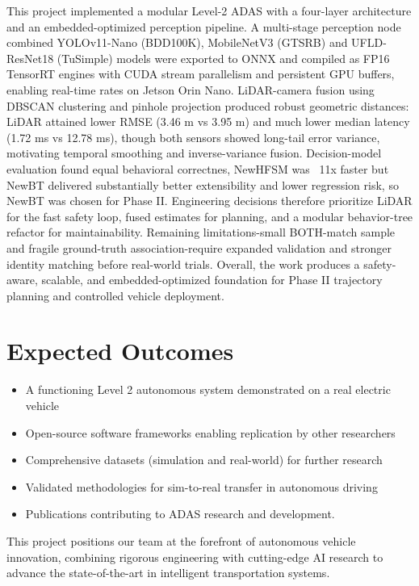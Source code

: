 \documentclass[12pt, a4paper]{report}
\begin{document}
This project implemented a modular Level-2 ADAS with a four-layer architecture and an 
embedded-optimized perception pipeline. A multi-stage perception node combined YOLOv11-Nano (BDD100K),
MobileNetV3 (GTSRB) and UFLD-ResNet18 (TuSimple) models were exported to ONNX and compiled as FP16 
TensorRT engines with CUDA stream parallelism and persistent GPU buffers, enabling real-time rates 
on Jetson Orin Nano. LiDAR-camera fusion using DBSCAN clustering and pinhole projection produced robust
geometric distances: LiDAR attained lower RMSE (3.46 m vs 3.95 m) and much lower median latency (1.72 ms vs 12.78 ms), 
though both sensors showed long-tail error variance, motivating temporal smoothing and inverse-variance fusion. 
Decision-model evaluation found equal behavioral correctnes, NewHFSM was ~11x faster but NewBT delivered 
substantially better extensibility and lower regression risk, so NewBT was chosen for Phase II. 
Engineering decisions therefore prioritize LiDAR for the fast safety loop, fused estimates for planning, 
and a modular behavior-tree refactor for maintainability. Remaining limitations-small BOTH-match sample 
and fragile ground-truth association-require expanded validation and stronger identity matching before 
real-world trials. Overall, the work produces a safety-aware, scalable, and embedded-optimized foundation 
for Phase II trajectory planning and controlled vehicle deployment.

\section*{Expected Outcomes}

\begin{itemize}
    \item A functioning Level 2 autonomous system demonstrated on a real electric vehicle
    \item Open-source software frameworks enabling replication by other researchers
    \item Comprehensive datasets (simulation and real-world) for further research
    \item Validated methodologies for sim-to-real transfer in autonomous driving
    \item Publications contributing to ADAS research and development.
\end{itemize}

This project positions our team at the forefront of autonomous vehicle innovation, combining rigorous engineering with cutting-edge AI research to advance the state-of-the-art in intelligent transportation systems.


\renewcommand{\bibname}{References}


\end{document}
